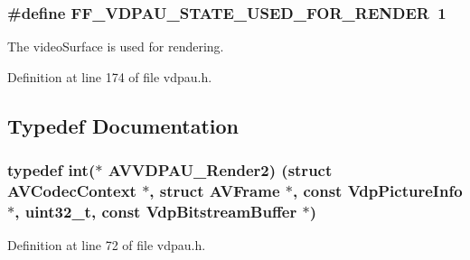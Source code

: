 \subsubsection[{\texorpdfstring{F\+F\+\_\+\+V\+D\+P\+A\+U\+\_\+\+S\+T\+A\+T\+E\+\_\+\+U\+S\+E\+D\+\_\+\+F\+O\+R\+\_\+\+R\+E\+N\+D\+ER}{FF_VDPAU_STATE_USED_FOR_RENDER}}]{\setlength{\rightskip}{0pt plus 5cm}\#define F\+F\+\_\+\+V\+D\+P\+A\+U\+\_\+\+S\+T\+A\+T\+E\+\_\+\+U\+S\+E\+D\+\_\+\+F\+O\+R\+\_\+\+R\+E\+N\+D\+ER~1}\hypertarget{group__lavc__codec__hwaccel__vdpau_ga87551b42b8cc836804d9e0c5ac6fa367}{}\label{group__lavc__codec__hwaccel__vdpau_ga87551b42b8cc836804d9e0c5ac6fa367}


The video\+Surface is used for rendering. 



Definition at line 174 of file vdpau.\+h.



\subsection{Typedef Documentation}
\subsubsection[{\texorpdfstring{A\+V\+V\+D\+P\+A\+U\+\_\+\+Render2}{AVVDPAU_Render2}}]{\setlength{\rightskip}{0pt plus 5cm}typedef {\bf int}($\ast$ A\+V\+V\+D\+P\+A\+U\+\_\+\+Render2) (struct {\bf A\+V\+Codec\+Context} $\ast$, struct {\bf A\+V\+Frame} $\ast$, {\bf const} Vdp\+Picture\+Info $\ast$, {\bf uint32\+\_\+t}, {\bf const} Vdp\+Bitstream\+Buffer $\ast$)}\hypertarget{group__lavc__codec__hwaccel__vdpau_ga1f243045ef2673ebe2a50a8431f3dfa7}{}\label{group__lavc__codec__hwaccel__vdpau_ga1f243045ef2673ebe2a50a8431f3dfa7}


Definition at line 72 of file vdpau.\+h.

